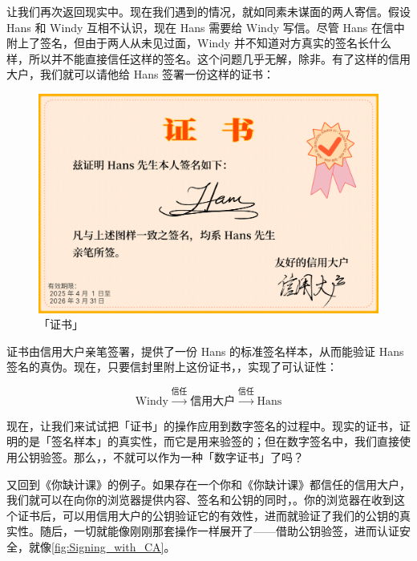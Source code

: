 让我们再次返回现实中。现在我们遇到的情况，就如同素未谋面的两人寄信。假设 Hans 和 Windy 互相不认识，现在 Hans 需要给 Windy 写信。尽管 Hans 在信中附上了签名，但由于两人从未见过面，Windy 并不知道对方真实的签名长什么样，所以并不能直接信任这样的签名。这个问题几乎无解，除非。有了这样的信用大户，我们就可以请他给 Hans 签署一份这样的证书：

\begin{figure}[htb!]
  \centering
  \includegraphics[width=.65\textwidth]{assets/surpass/Certificate.pdf}
  \caption{「证书」}
  \label{fig:Certificate}
\end{figure}

证书由信用大户亲笔签署，提供了一份 Hans 的标准签名样本，从而能验证 Hans 签名的真伪。现在，只要信封里附上这份证书，，实现了可认证性：

\[ \text{Windy} \xrightarrow{\text{信任}} \text{信用大户} \xrightarrow{\text{信任}} \text{Hans} \]

现在，让我们来试试把「证书」的操作应用到数字签名的过程中。现实的证书，证明的是「签名样本」的真实性，而它是用来验签的；但在数字签名中，我们直接使用公钥验签。那么，，不就可以作为一种「数字证书」了吗？

又回到《你缺计课》的例子。如果存在一个你和《你缺计课》都信任的信用大户，我们就可以在向你的浏览器提供内容、签名和公钥的同时，。你的浏览器在收到这个证书后，可以用信用大户的公钥验证它的有效性，进而就验证了我们的公钥的真实性。随后，一切就能像刚刚那套操作一样展开了——借助公钥验签，进而认证安全，就像\autoref{fig:Signing_with_CA}。

